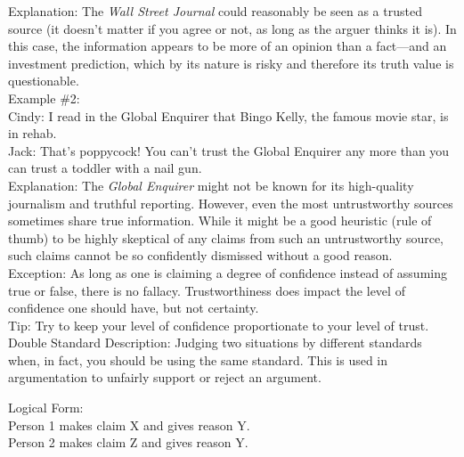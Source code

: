 \documentclass[a4paper,12pt,single,pdftex]{scrbook}
\begin{document}
    
      Explanation: The {\it Wall Street Journal} could reasonably be seen as a trusted source (it doesn't matter if you agree or not, as long as the arguer thinks it is). In this case, the information appears to be more of an opinion than a fact—and an investment prediction, which by its nature is risky and therefore its truth value is questionable.
    \\

    
      Example \#2:
    \\

    
      Cindy: I read in the Global Enquirer that Bingo Kelly, the famous movie star, is in rehab.
    \\

    
      Jack: That's poppycock! You can't trust the Global Enquirer any more than you can trust a toddler with a nail gun.
    \\

    
      Explanation: The {\it Global Enquirer} might not be known for its high-quality journalism and truthful reporting. However, even the most untrustworthy sources sometimes share true information. While it might be a good heuristic (rule of thumb) to be highly skeptical of any claims from such an untrustworthy source, such claims cannot be so confidently dismissed without a good reason.
    \\

    
      Exception: As long as one is claiming a degree of confidence instead of assuming true or false, there is no fallacy. Trustworthiness does impact the level of confidence one should have, but not certainty.
    \\

    
      Tip: Try to keep your level of confidence proportionate to your level of trust.
    \\

  

Double Standard
    Description: Judging two situations by different standards when, in fact, you should be using the same standard. This is used in argumentation to unfairly support or reject an argument.

    
      Logical Form:
    \\

    
      Person 1 makes claim X and gives reason Y.
    \\

    
      Person 2 makes claim Z and gives reason Y.
    \\
\end{document}
